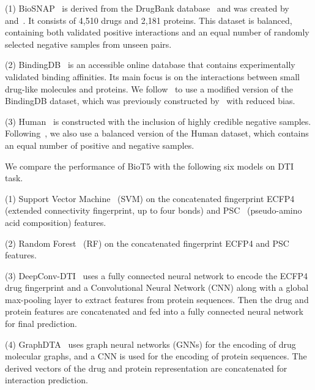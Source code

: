 \documentclass[11pt]{article}
\newcommand{\method}{{BioT5}}
\begin{document}
\noindent(1) BioSNAP~\citep{zitnik2018biosnap} is derived from the DrugBank database~\citep{wishart2018drugbank} and was created by~\citet{Huang2021MolTransMI} and~\citet{zitnik2018biosnap}. It consists of 4,510 drugs and 2,181 proteins. This dataset is balanced, containing both validated positive interactions and an equal number of randomly selected negative samples from unseen pairs.

\noindent(2) BindingDB~\citep{liu2007bindingdb} is an accessible online database that contains experimentally validated binding affinities. Its main focus is on the interactions between small drug-like molecules and proteins. We follow~\citet{bai2023interpretable} to use a modified version of the BindingDB dataset, which was previously constructed by~\citet{bai2021hierarchical} with reduced bias. 

\noindent(3) Human~\cite{liu2015improving,chen2020transformercpi} is constructed with the inclusion of highly credible negative samples. Following~\citet{bai2023interpretable}, we also use a balanced version of the Human dataset, which contains an equal number of positive and negative samples. 


\noindent We compare the performance of \method{} with the following six models on DTI task.

\noindent(1) Support Vector Machine~\citep{cortes1995support} (SVM) on the concatenated fingerprint ECFP4~\citep{DBLP:journals/jcisd/RogersH10} (extended connectivity fingerprint, up to four bonds) and PSC~\citep{DBLP:journals/bioinformatics/CaoXL13} (pseudo-amino acid composition) features.

\noindent(2) Random Forest~\citep{ho1995random} (RF) on the concatenated fingerprint ECFP4 and PSC features.

\noindent(3) DeepConv-DTI~\citep{Lee2019DeepConvDTIPO} uses a fully connected neural network to encode the ECFP4 drug fingerprint and a Convolutional Neural Network (CNN) along with a global max-pooling layer to extract features from protein sequences. Then the drug and protein features are concatenated and fed into a fully connected neural network for final prediction.

\noindent(4) GraphDTA~\citep{Nguyen2020GraphDTAPD} uses graph neural networks (GNNs) for the encoding of drug molecular graphs, and a CNN is used for the encoding of protein sequences. The derived vectors of the drug and protein representation are concatenated for interaction prediction.
\end{document}
